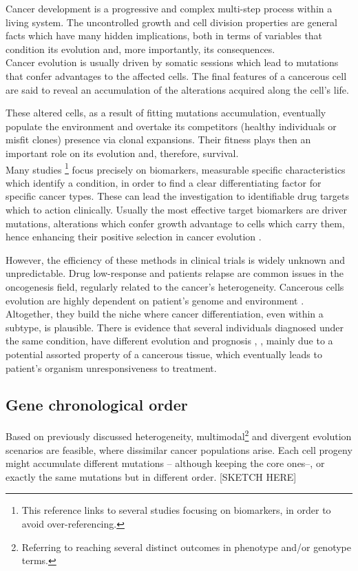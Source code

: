 Cancer development is a progressive and complex multi-step process within a living system. The uncontrolled growth and cell division properties are general facts which have many hidden implications, both in terms of variables that condition its evolution and, more importantly, its consequences.
\\

Cancer evolution is usually driven by somatic sessions which lead to mutations that confer advantages to the affected cells. The final features of a cancerous cell are said to reveal an accumulation of the alterations acquired along the cell’s life.

These altered cells, as a result of fitting mutations accumulation, eventually populate the environment and overtake its competitors (healthy individuals or misfit clones) presence via clonal expansions. Their fitness plays then an important role on its evolution and, therefore, survival.
\\

Many studies \cite{Rifai2006ProteinUtility}\footnote{This reference links to several studies focusing on biomarkers, in order to avoid over-referencing.} focus precisely on biomarkers, measurable specific characteristics which identify a condition, in order to find a clear differentiating factor for specific cancer types. These can lead the investigation to identifiable drug targets which to action clinically. Usually the most effective target biomarkers are driver mutations, 
alterations which confer growth advantage to cells which carry them, hence enhancing their positive selection in cancer evolution \cite{Stratton2009TheGenome}.

However, the efficiency of these methods in clinical trials is widely unknown and unpredictable. Drug low-response and patients relapse are common issues in the oncogenesis field, regularly related to the cancer’s heterogeneity. Cancerous cells evolution are highly dependent on patient’s genome and environment \cite{Yates2012EvolutionGenome}. Altogether, they build the niche where cancer differentiation, even within a subtype, is plausible. There is evidence that several individuals diagnosed under the same condition, have different evolution and prognosis \cite{Gao2016LossTherapy}, \cite{Zaretsky2016MutationsMelanoma}, mainly due to a potential assorted property of a cancerous tissue, which eventually leads to patient's organism unresponsiveness to treatment.
\\

\subsection{Gene chronological order}
Based on previously discussed heterogeneity, multimodal\footnote{Referring to reaching several distinct outcomes in phenotype and/or genotype terms.} and divergent evolution scenarios are feasible, where dissimilar cancer populations arise. Each cell progeny might accumulate different mutations -- although keeping the core ones--, or exactly the same mutations but in different order. [SKETCH HERE]

